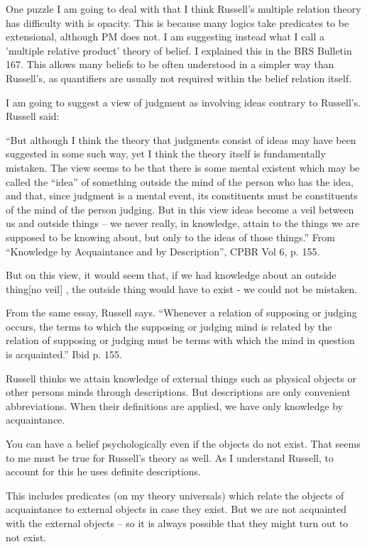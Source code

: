 \documentclass[12pt]{article}
\begin{document}
One puzzle I am going to deal with that I think Russell's multiple relation theory has difficulty with is opacity. This is because many logics take predicates to be extensional, although PM does not. I am suggesting instead what I call a 'multiple relative product' theory of belief. I explained this in the BRS Bulletin 167. This allows many beliefs to be often understood in a simpler way than Russell's, as quantifiers are usually not required within the belief relation itself. 

I am going to suggest a view of judgment as involving ideas contrary to Russell’s. Russell said:

“But although I think the theory that judgments consist of ideas may have been suggested in some such way, yet I think the theory itself is fundamentally mistaken. The view seems to be that there is some mental existent which may be called the “idea” of something outside the mind of the person who has the idea, and that, since judgment is a mental event, its constituents must be constituents of the mind of the person judging. But in this view ideas become a veil between us and outside things – we never really, in knowledge, attain to the things we are supposed to be knowing about, but only to the ideas of those things.”   From “Knowledge by Acquaintance and by Description”, CPBR Vol 6, p. 155.

But on this view, it would seem that, if we had knowledge about an outside thing[no veil] , the outside thing would have to exist - we could not be mistaken.

From the same essay, Russell says. 
“Whenever a relation of supposing or judging occurs, the terms to which the supposing or judging mind is related by the relation of supposing or judging must be terms with which the mind in question is acquainted.” Ibid p. 155.

Russell thinks we attain knowledge of external things such as physical objects or other persons minds through descriptions. But descriptions are only convenient abbreviations. When their definitions are applied, we have only knowledge by acquaintance.

You can have a belief psychologically even if the objects do not exist. That seems to me must be true for Russell’s theory as well. As I understand Russell, to account for this he uses definite descriptions.

This includes predicates (on my theory universals) which relate the objects of acquaintance to external objects in case they exist. But we are not acquainted with the external objects – so it is always possible that they might turn out to not exist.
\end{document}
